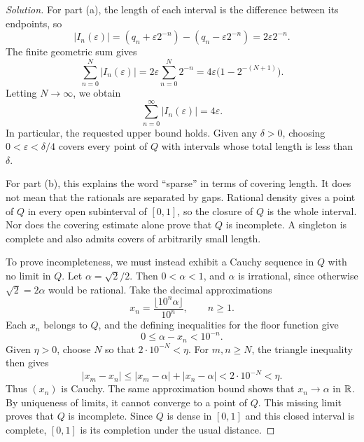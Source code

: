 \begin{proof}[Solution]
  For part (a), the length of each interval is the difference between
  its endpoints, so
  \[
    |I_n(\varepsilon)|
      =(q_n+\varepsilon2^{-n})-(q_n-\varepsilon2^{-n})
      =2\varepsilon2^{-n}.
  \]
  The finite geometric sum gives
  \[
    \sum_{n=0}^{N}|I_n(\varepsilon)|
      =2\varepsilon\sum_{n=0}^{N}2^{-n}
      =4\varepsilon\bigl(1-2^{-(N+1)}\bigr).
  \]
  Letting $N\to\infty$, we obtain
  \[
    \sum_{n=0}^{\infty}|I_n(\varepsilon)|=4\varepsilon.
  \]
  In particular, the requested upper bound holds. Given any $\delta>0$,
  choosing $0<\varepsilon<\delta/4$ covers every point of $Q$ with
  intervals whose total length is less than $\delta$.

  For part (b), this explains the word ``sparse'' in terms of covering
  length. It does not mean that the rationals are separated by gaps.
  Rational density gives a point of $Q$ in every open subinterval of
  $[0,1]$, so the closure of $Q$ is the whole interval. Nor does the
  covering estimate alone prove that $Q$ is incomplete. A singleton
  is complete and also admits covers of arbitrarily small length.

  To prove incompleteness, we must instead exhibit a Cauchy sequence
  in $Q$ with no limit in $Q$. Let $\alpha=\sqrt{2}/2$. Then
  $0<\alpha<1$, and $\alpha$ is irrational, since otherwise
  $\sqrt{2}=2\alpha$ would be rational. Take the decimal approximations
  \[
    x_n=\frac{\lfloor10^n\alpha\rfloor}{10^n},\qquad n\geq1.
  \]
  Each $x_n$ belongs to $Q$, and the defining inequalities for the
  floor function give
  \[
    0\leq\alpha-x_n<10^{-n}.
  \]
  Given $\eta>0$, choose $N$ so that $2\cdot10^{-N}<\eta$. For
  $m,n\geq N$, the triangle inequality then gives
  \[
    |x_m-x_n|
      \leq|x_m-\alpha|+|x_n-\alpha|
      <2\cdot10^{-N}<\eta.
  \]
  Thus $(x_n)$ is Cauchy. The same approximation bound shows that
  $x_n\to\alpha$ in $\mathbb{R}$. By uniqueness of limits, it cannot converge
  to a point of $Q$. This missing limit proves that $Q$ is incomplete.
  Since $Q$ is dense in $[0,1]$ and this closed interval is complete,
  $[0,1]$ is its completion under the usual distance.
\end{proof}
